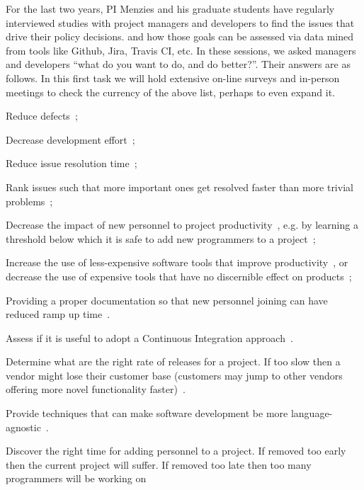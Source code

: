 For the last two years, 
PI Menzies and his graduate students have  regularly interviewed studies with project
managers and developers to find the issues that drive their policy decisions.
and how those goals can be assessed via data mined from tools like Github, Jira, Travis CI, etc. 
In these sessions, we asked managers and developers ``what do you want to do, and do better?''. Their answers are as follows.
In this first task we will hold extensive on-line surveys   and in-person meetings to check the currency of the above list, perhaps to even expand it.
\bi
\item[$G_1=$]
Reduce defects~\cite{moniruzzaman2013comparative}; 
\item[$G_2=$]
Decrease development effort~\cite{sarro2016multi,menzies2017negative}; 
\item[$G_3=$]
Reduce issue resolution time~\cite{rees2017better}; 
\item[$G_4=$]
Rank issues such that more important ones get resolved faster than more trivial problems~\cite{moniruzzaman2013comparative}; 
\item[$G_5=$]
Decrease the impact of new personnel to project productivity~\cite{brooks1975mythical}, e.g. by learning a threshold below which it is safe to add new programmers to a project~\cite{agrawal17time};
\item[$G_6=$]
Increase the use of less-expensive software tools that improve productivity~\cite{bruckhaus1996impact}, or decrease the use of expensive tools that have no discernible
effect on products~\cite{rahman2014comparing}; 
\item[$G_7=$] Providing a proper documentation so that new personnel joining can have reduced ramp up time~\cite{petersen2009comparison}.
\item[$G_8=$]
Assess if it is useful to adopt a Continuous Integration approach~\cite{shahin2017continuous,vasilescu2015quality}.
\item[$G_9=$]
Determine what are the  right rate of releases for a project. 
If too slow  then a vendor might lose their customer base (customers may jump to other vendors offering more novel functionality
faster)~\cite{chen2015continuous}.
\item[$G_{10}=$] Provide techniques that can make software development be more language-agnostic~\cite{mens2005challenges}.
\item[$G_{11}=$]
Discover the right time for adding personnel to a project. If removed too early then the current project will suffer. If removed too late then too many programmers will be working on 
